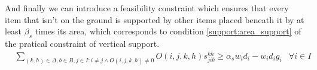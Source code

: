 And finally we can introduce a feasibility constraint which ensures that every item that isn't on the ground is supported by other items placed beneath it by at least $\beta_s$ times its area, which corresponds to condition \ref{support:area_support} of the pratical constraint of vertical support.
\begin{eqnarray}
    & \sum\limits_{(k, h) \in \Delta, b \in B, j \in I : i \neq j \land O(i, j, k, h) \neq 0}{ O(i, j, k, h)s^{k h}_{j i b}} \ge \alpha_s w_i d_i - w_i d_i g_i & \forall i \in I \label{cons:every_item_is_supported}
\end{eqnarray}